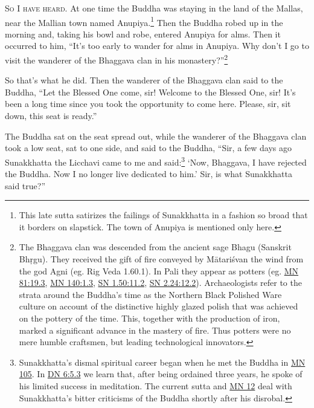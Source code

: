 \documentclass[12pt,openany]{book}%
\newcommand*{\scevam}[1]{\textsc{#1}}
\begin{document}
\scevam{So I have heard. }At one time the Buddha was staying in the land of the Mallas, near the Mallian town named Anupiya.\footnote{This late sutta satirizes the failings of Sunakkhatta in a fashion so broad that it borders on slapstick. The town of Anupiya is mentioned only here. } Then the Buddha robed up in the morning and, taking his bowl and robe, entered Anupiya for alms. Then it occurred to him, “It’s too early to wander for alms in Anupiya. Why don’t I go to visit the wanderer of the Bhaggava clan in his monastery?”\footnote{The Bhaggava clan was descended from the ancient sage Bhagu (Sanskrit \textsanskrit{Bhṛgu}). They received the gift of fire conveyed by \textsanskrit{Mātariśvan} the wind from the god Agni (eg. Rig Veda 1.60.1). In Pali they appear as potters (eg. \href{https://suttacentral.net/mn81/en/sujato\#19.3}{MN 81:19.3}, \href{https://suttacentral.net/mn140/en/sujato\#1.3}{MN 140:1.3}, \href{https://suttacentral.net/sn1.50/en/sujato\#11.2}{SN 1.50:11.2}, \href{https://suttacentral.net/sn2.24/en/sujato\#12.2}{SN 2.24:12.2}). Archaeologists refer to the strata around the Buddha’s time as the Northern Black Polished Ware culture on account of the distinctive highly glazed polish that was achieved on the pottery of the time. This, together with the production of iron, marked a significant advance in the mastery of fire. Thus potters were no mere humble craftsmen, but leading technological innovators. } 

So that’s what he did. Then the wanderer of the Bhaggava clan said to the Buddha, “Let the Blessed One come, sir! Welcome to the Blessed One, sir! It’s been a long time since you took the opportunity to come here. Please, sir, sit down, this seat is ready.” 

The Buddha sat on the seat spread out, while the wanderer of the Bhaggava clan took a low seat, sat to one side, and said to the Buddha, “Sir, a few days ago Sunakkhatta the Licchavi came to me and said:\footnote{Sunakkhatta’s dismal spiritual career began when he met the Buddha in \href{https://suttacentral.net/mn105/en/sujato}{MN 105}. In \href{https://suttacentral.net/dn6/en/sujato\#5.3}{DN 6:5.3} we learn that, after being ordained three years, he spoke of his limited success in meditation. The current sutta and \href{https://suttacentral.net/mn12/en/sujato}{MN 12} deal with Sunakkhatta’s bitter criticisms of the Buddha shortly after his disrobal. } ‘Now, Bhaggava, I have rejected the Buddha. Now I no longer live dedicated to him.’ Sir, is what Sunakkhatta said true?” 
\end{document}
